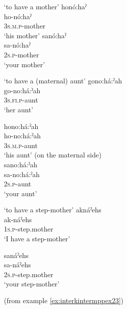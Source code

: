 \ea\label{ex:interkintermppex14}  ‘to have a mother’
\ea honó:haˀ\\
\gll ho-nó:haˀ\\
\textsc{3s.m.p}-mother\\
\glt `his mother'
\ex sanó:haˀ\\
\gll sa-nó:haˀ\\
 \textsc{2s.p}-mother\\
\glt `your mother'
\z
\z

\ea\label{ex:interkintermppex17}  ‘to have a (maternal) aunt’
\ea gono:há:ˀah\\
\gll go-no:há:ˀah\\
 \textsc{3s.fi.p}-aunt\\
\glt `her aunt'

\ex hono:há:ˀah\\
\gll ho-no:há:ˀah\\
\textsc{3s.m.p}-aunt\\
\glt ‘his aunt’ (on the maternal side)\\

\ex sano:há:ˀah\\
\gll sa-no:há:ˀah\\
 \textsc{2s.p}-aunt\\
\glt `your aunt'

\z
\z

\ea\label{ex:interkintermppex24}  ‘to have a step-mother’
\ea aknáˀehs\\
\gll ak-náˀehs\\
 \textsc{1s.p}-step.mother\\
\glt `I have a step-mother'

\ex sanáˀehs\\
\gll sa-náˀehs\\
 \textsc{2s.p}-step.mother\\
\glt `your step-mother'

 (from example \ref{ex:interkintermppex23})
\z
\z

